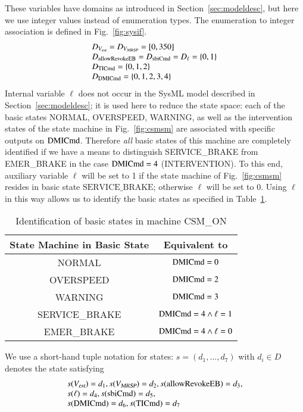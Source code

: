 These variables have domains as introduced in Section~\ref{sec:modeldesc}, but here we use 
integer values instead of enumeration types. The enumeration to integer association is defined in Fig.~\ref{fig:sysif}.
\[
\begin{array}{l}
 D_{V_{\text{\sl est}}} = D_{V_{\text{\sl MRSP}}} =  [0,350]
\\
D_{\text{allowRevokeEB}}=D_{\text{sbiCmd}}=D_\ell  = \{0,1\}
\\
D_{\text{TICmd}} =\{0,1,2\}
\\
D_{\text{DMICmd}} = \{0,1, 2,3,4\}
\end{array}
\]
Internal variable $\ell$ does not occur in the SysML model described in Section~\ref{sec:modeldesc}; it is used here to reduce the state space: each of the basic states {\sf NORMAL}, {\sf OVERSPEED}, {\sf WARNING}, as well as the intervention states  of the state machine in Fig.~\ref{fig:csmsm}  are associated with specific outputs on $\text{DMICmd}$. Therefore {\it all}
basic states of this machine are completely identified if we have a means to distinguish {\sf SERVICE\_BRAKE} from {\sf EMER\_BRAKE} in the case $\text{DMICmd} =  4$ (INTERVENTION). To this end, auxiliary variable $\ell$ will be set to 1 if   the state machine of Fig.~\ref{fig:csmsm} resides in basic state $\text {SERVICE\_BRAKE}$; otherwise $\ell$ will be set to 0. Using $\ell$ in this way allows us to identify the basic states as specified in Table~\ref{tab:basicstates}.
\begin{table}[htdp]
\caption{Identification of basic states in machine {\sf CSM\_ON}}
\begin{center}
\footnotesize
\begin{tabular}{|c|c|}
\hline\hline
{\bf State Machine in Basic State} & {\bf Equivalent to}
\\\hline\hline
{\sf NORMAL} & $\text{DMICmd} = 0$
\\\hline
{\sf OVERSPEED} & $\text{DMICmd} = 2$
\\\hline
{\sf WARNING} & $\text{DMICmd} = 3$
\\\hline
{\sf SERVICE\_BRAKE} & $\text{DMICmd} = 4 \wedge \ell = 1$
 \\\hline
{\sf EMER\_BRAKE} & $\text{DMICmd} = 4 \wedge \ell = 0 $
\\\hline\hline
\end{tabular}
\normalsize
\end{center}
\label{tab:basicstates}
\end{table}%

We use a short-hand   tuple notation for states: $s = (d_1,\dots,d_7)$ with $d_i\in D$ denotes the state
satisfying
\[
\begin{array}{l}
 s({V_{\text{\sl est}}}) = d_1, s({V_{\text{\sl MRSP}}}) = d_2, s(\text{allowRevokeEB}) = d_3, 
\\
s(\ell) = d_4, s(\text{sbiCmd}) = d_5,
\\
s(\text{DMICmd}) = d_6, s(\text{TICmd}) = d_7
\end{array}
\]
 

